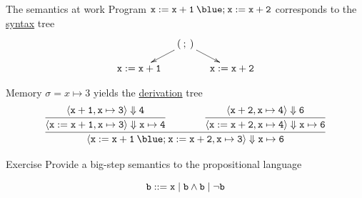 \documentclass{beamer}
\begin{document}
\begin{frame}{The semantics at work}
        Program $\mathtt{x := x + 1 \> {\blue ;} \> x := x + 2}$ corresponds to the 
        \alert{\underline{syntax}} tree 
        \[
                \xymatrix@C=10pt@R=10pt{
                        & (\> ; \>) \ar[dl] \ar[dr]  & \\
                        \mathtt{x := x + 1} & & \mathtt{x := x + 2} 
                }
        \]

        \vspace{0.4cm}
        Memory $\sigma = x \mapsto 3$ yields the \alert{\underline{derivation}} tree
        \[
                \infer{
                        \langle \mathtt{ x := x + 1 \> {\blue ;} \> x := x + 2 }, \mathtt{x \mapsto 3}
                        \rangle \Downarrow \mathtt{x \mapsto 6}
                }{
                        \infer{
                                \langle \mathtt{x := x +1}, \mathtt{x \mapsto 3} \rangle 
                                \Downarrow \mathtt{x \mapsto 4}
                        }{
                                \langle \mathtt{x + 1}, \mathtt{x \mapsto 3} \rangle \Downarrow
                                \mathtt{4}
                        }\qquad \qquad                        
                        \infer{
                                \langle \mathtt{x := x + 2}, \mathtt{x \mapsto 4} \rangle 
                                \Downarrow \mathtt{x \mapsto 6}
                        }{
                                \langle \mathtt{x + 2}, \mathtt{x \mapsto 4} \rangle \Downarrow
                                \mathtt{6}
                        }
                }
        \]
\end{frame}

\begin{frame}{Exercise}
        Provide a big-step semantics to the propositional language

        \begin{block}{\vspace*{-3.5ex}}
        \[
                \mathtt{b} ::= \mathtt{x} \mid \mathtt{b} \wedge \mathtt{b} \mid \neg \mathtt{b}
        \]
        \end{block} 

\end{frame}
\end{document}
